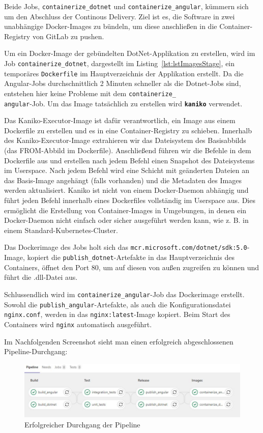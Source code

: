 Beide Jobs, \texttt{containerize\_dotnet} und \texttt{containerize\_angular}, kümmern sich um den Abschluss der Continous Delivery. Ziel ist es, die Software in zwei unabhängige Docker-Images zu bündeln, um diese anschließen in die Container-Registry von GitLab zu pushen.

Um ein Docker-Image der gebündelten DotNet-Applikation zu  erstellen, wird im Job \texttt{containerize\_dotnet}, dargestellt im Listing~\ref{lst:lstImagesStage}, ein temporäres \texttt{Dockerfile} im Hauptverzeichnis der Applikation erstellt. Da die Angular-Jobs durchschnittlich 2 Minuten schneller als die Dotnet-Jobs sind, entstehen hier keine Probleme mit dem \texttt{containerize\_\\angular}-Job. Um das Image tatsächlich zu erstellen wird \textbf{\texttt{kaniko}} verwendet.

Das Kaniko-Executor-Image ist dafür verantwortlich, ein Image aus einem Dockerfile zu erstellen und es in eine Container-Registry zu schieben. Innerhalb des Kaniko-Executor-Image extrahieren wir das Dateisystem des Basisabbilds (das FROM-Abbild im Dockerfile). Anschließend führen wir die Befehle in dem Dockerfile aus und erstellen nach jedem Befehl einen Snapshot des Dateisystems im Userspace. Nach jedem Befehl wird eine Schicht mit geänderten Dateien an das Basis-Image angehängt (falls vorhanden) und die Metadaten des Images werden aktualisiert\cite{kaniko}. Kaniko ist nicht von einem Docker-Daemon abhängig und führt jeden Befehl innerhalb eines Dockerfiles vollständig im Userspace aus. Dies ermöglicht die Erstellung von Container-Images in Umgebungen, in denen ein Docker-Daemon nicht einfach oder sicher ausgeführt werden kann, wie z. B. in einem Standard-Kubernetes-Cluster.\cite{kaniko}

Das Dockerimage des Jobs holt sich das \texttt{mcr.microsoft.com/dotnet/sdk:5.0}-Image, kopiert die \texttt{publish\_dotnet}-Artefakte in das Hauptverzeichnis des Containers, öffnet den Port 80, um auf diesen von außen zugreifen zu können und führt die .dll-Datei aus.

Schlussendlich wird im \texttt{containerize\_angular}-Job das Dockerimage erstellt. Sowohl die \texttt{publish\_angular}-Artefakte, als auch die Konfigurationsdatei \texttt{nginx.conf}, werden in das \texttt{nginx:latest}-Image kopiert. Beim Start des Containers wird \texttt{nginx} automatisch ausgeführt.

Im Nachfolgenden Screenshot sieht man einen erfolgreich abgeschlossenen Pipeline-Durchgang:

\begin{figure}[H]
	\centerline{
		\includegraphics[width=1\textwidth, frame]{./grafiken/build_test_release_successful.JPG}
	}
	\vskip0pt
	\caption{Erfolgreicher Durchgang der Pipeline}
\end{figure}